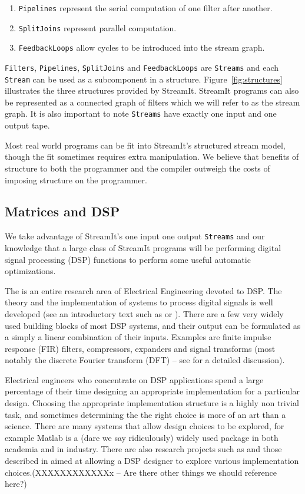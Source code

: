 \begin{enumerate}
\item {\tt Pipelines} represent the serial computation of one filter after another.
\item {\tt SplitJoins} represent parallel computation. 
\item {\tt FeedbackLoops} allow cycles to be introduced into the stream graph. 
\end{enumerate}

{\tt Filters}, {\tt Pipelines}, {\tt SplitJoins} and {\tt FeedbackLoops} 
are {\tt Streams} and each {\tt Stream} can be used as a subcomponent in 
a structure. Figure~\ref{fig:structures} illustrates the three structures provided by StreamIt.
StreamIt programs can also be represented as a connected graph of filters 
which we will refer to as the stream graph. It is also important to note
{\tt Streams} have exactly one input and one output tape.

Most real world programs can be fit into StreamIt's structured stream model, 
though the fit sometimes requires extra manipulation. We believe
that benefits of structure to both the programmer and the compiler outweigh the
costs of imposing structure on the programmer.

\subsection{Matrices and DSP}
We take advantage of StreamIt's one input one output {\tt Streams} and 
our knowledge that a large class of StreamIt programs will be performing
digital signal processing (DSP) functions to perform some useful automatic 
optimizations.

The is an entire research area of Electrical Engineering devoted to DSP. The
theory and the implementation of systems to process digital signals is well developed (see
an introductory text such as\cite{oppenheim-discrete} or \cite{lyons-understanding}). 
There are a few very widely used building blocks of most DSP systems, and their output 
can be formulated as a simply a linear combination of their inputs. Examples are
finite impulse response (FIR) filters, compressors, expanders and signal transforms
(most notably the discrete Fourier transform (DFT) -- 
see \cite{oppenheim-discrete} for a detailed discussion).

Electrical engineers who concentrate on DSP applications spend a large percentage of their 
time designing an appropriate implementation for a particular design. Choosing
the appropriate implementation structure is a highly non trivial task, and sometimes determining the 
the right choice is more of an art than a science. There are many systems that allow design choices
to be explored, for example Matlab\cite{matlab} is a (dare we say ridiculously) widely used package 
in both academia and in industry. There are also research projects such as \cite{covell-ade} 
and those described in \cite{oppenheim-symbolic} aimed at allowing a DSP designer to explore
various implementation choices.(XXXXXXXXXXXXx -- Are there other things we should reference here?) 

